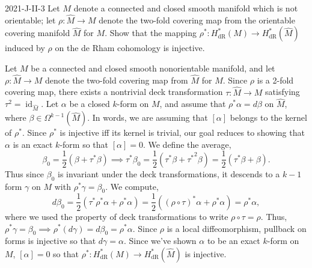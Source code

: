 \documentclass{article}
\begin{document}
	
	\begin{prb}{2021-J-II-3}
		Let $M$ denote a connected and closed smooth manifold which is not orientable; let $\rho: \hat{M} \to M$ denote the two-fold covering map from the orientable covering manifold $\hat{M}$ for $M$. Show that the mapping $\rho^{\ast}: H^{\ast}_{\text{dR}}(M) \to H^{\ast}_{\text{dR}}(\hat{M})$ induced by $\rho$ on the de Rham cohomology is injective. 
	\end{prb}
	Let $M$ be a connected and closed smooth nonorientable manifold, and let $\rho: \hat{M} \to M$ denote the two-fold covering map from $\hat{M}$ for $M$. Since $\rho$ is a 2-fold covering map, there exists a nontrivial deck transformation $\tau: \hat{M} \to M$ satisfying $\tau^{2} = \operatorname{id}_{\hat{M}}$. Let $\alpha$ be a closed $k$-form on $M$, and assume that $\rho^{\ast}\alpha = d\beta$ on $\hat{M}$, where $\beta \in \Omega^{k -1}(\hat{M})$. In words, we are assuming that $[\alpha]$ belongs to the kernel of $\rho^{\ast}$. Since $\rho^{\ast}$ is injective iff its kernel is trivial, our goal reduces to showing that $\alpha$ is an exact $k$-form so that $[\alpha] = 0$. We define the average, 
	\begin{equation*}
		\beta_{0} = \frac{1}{2}(\beta + \tau^{\ast}\beta) \implies \tau^{\ast}\beta_{0} = \frac{1}{2}(\tau^{\ast}\beta + {\tau^{\ast}}^{2}\beta) = \frac{1}{2}(\tau^{\ast}\beta + \beta). 
	\end{equation*}
	Thus since $\beta_{0}$ is invariant under the deck transformations, it descends to a $k - 1$ form $\gamma$ on $M$ with $\rho^{\ast}\gamma = \beta_{0}$. We compute, 
	\begin{equation*}
		d\beta_{0} = \frac{1}{2}(\tau^{\ast}\rho^{\ast}\alpha + \rho^{\ast}\alpha) = \frac{1}{2}((\rho \circ\tau)^{\ast}\alpha + \rho^{\ast}\alpha) = \rho^{\ast}\alpha, 
	\end{equation*}
	where we used the property of deck transformations to write $\rho \circ \tau = \rho$. Thus, $\rho^{\ast}\gamma = \beta_{0} \implies \rho^{\ast}(d\gamma) = d\beta_{0} = \rho^{\ast}\alpha$. Since $\rho$ is a local diffeomorphism, pullback on forms is injective so that $d\gamma = \alpha$. Since we've shown $\alpha$ to be an exact $k$-form on $M$, $[\alpha] = 0$ so that $\rho^{\ast}: H^{\ast}_{\text{dR}}(M) \to H^{\ast}_{\text{dR}}(\hat{M})$ is injective. 
	
\end{document}
